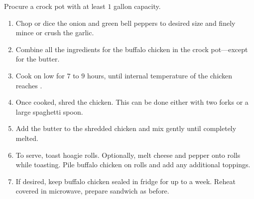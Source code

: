 \documentclass{article}
\begin{document}
\instructions
Procure a crock pot with at least $1$ gallon capacity.
\begin{enumerate}
    \item Chop or dice the onion and green bell peppers to desired size and finely mince or crush the garlic.
    \item Combine all the ingredients for the buffalo chicken in the crock pot---except for the butter.
    \item Cook on low for $7$ to $9$ hours, until internal temperature of the chicken reaches .
    \item Once cooked, shred the chicken. This can be done either with two forks or a large spaghetti spoon.
    \item Add the butter to the shredded chicken and mix gently until completely melted.
    \item To serve, toast hoagie rolls. Optionally, melt cheese and pepper onto rolls while toasting. Pile buffalo chicken on rolls and add any additional toppings.
    \item If desired, keep buffalo chicken sealed in fridge for up to a week. Reheat covered in microwave, prepare sandwich as before.
\end{enumerate}

\spewfootnotes
\end{document}
